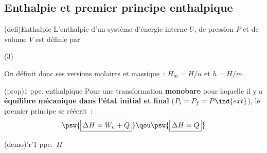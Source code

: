 \documentclass[../../main/main.tex]{subfiles}
\begin{document}
\subsection{Enthalpie et premier principe enthalpique}
\begin{tcb*}(defi){Enthalpie}
	L'enthalpie d'un système d'énergie interne $U$, de pression $P$ et de volume
	$V$ est définie par
	\psw{%
		\[
			\boxed{H = U+PV}
		\]
	}%
	\vspace{-15pt}
	\begin{tasks}[label=\bdmd](3)
		\task {}
		\task {}
		\task {}
	\end{tasks}
	On définit donc ses versions molaires et massique~: $H_m = H/n$ et $h = H/m$.
\end{tcb*}

\begin{tcbraster}[raster equal height=rows, raster columns=2]
	\begin{tcb*}[%
			list entry={\hspace*{-20pt}\protect\rcheck~~Premier principe enthalpique}%
		](prop){1\ier{} ppe. enthalpique}
		Pour une transformation \textbf{monobare} pour laquelle il y a
		\textbf{équilibre mécanique dans l'état initial et final} ($P_i = P_f =
		P\ind{ext}$), le premier principe se réécrit~:
		\[
			\psw{\boxed{\Delta{H} = W_u + Q}}
			\qou
			\psw{\boxed{\Delta{H} = Q}}
		\]
	\end{tcb*}
	\begin{tcb*}[%
			list entry={\hspace*{-20pt}\protect\rcheck~~Premier principe enthalpique}%
		](demo)'r'{1\ier{} ppe.\ $H$}
	\end{tcb*}
\end{tcbraster}
\end{document}
